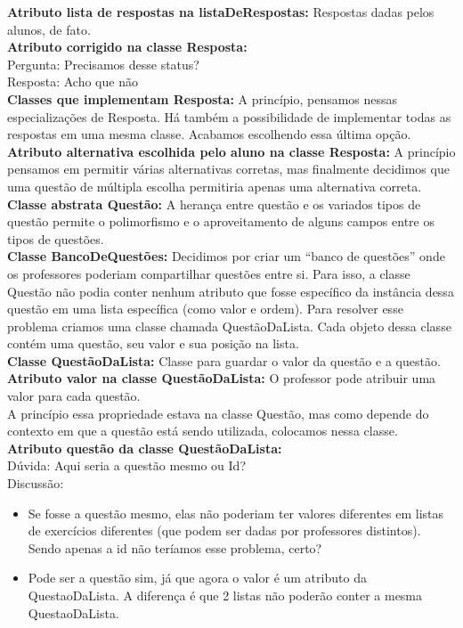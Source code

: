 \documentclass[12pt,letterpaper]{article}
\begin{document}
\textbf{Atributo lista de respostas na listaDeRespostas:}
Respostas dadas pelos alunos, de fato.\\


\textbf{Atributo corrigido na classe Resposta: }\\
Pergunta: Precisamos desse status?\\
Resposta: Acho que não\\


\textbf{Classes que implementam Resposta:}
A princípio, pensamos nessas especializações de Resposta. Há também a possibilidade de implementar todas as respostas em uma mesma classe. Acabamos escolhendo essa última opção.\\


\textbf{Atributo alternativa escolhida pelo aluno na classe Resposta:}
A princípio pensamos em permitir várias alternativas corretas, mas finalmente decidimos que uma questão de múltipla escolha permitiria apenas uma alternativa correta.\\


\textbf{Classe abstrata Questão:}
A herança entre questão e os variados tipos de questão permite o polimorfismo e o aproveitamento de alguns campos entre os tipos de questões.\\


\textbf{Classe BancoDeQuestões:}
Decidimos por criar um “banco de questões” onde os professores poderiam compartilhar questões entre si. Para isso, a classe Questão não podia conter nenhum atributo que fosse específico da instância dessa questão em uma lista específica (como valor e ordem). Para resolver esse problema criamos uma classe chamada QuestãoDaLista. Cada objeto dessa classe contém uma questão, seu valor e sua posição na lista.\\


\textbf{Classe QuestãoDaLista:}
Classe para guardar o valor da questão e a questão.\\

\textbf{Atributo valor na classe QuestãoDaLista:}
O professor pode atribuir uma valor para cada questão.\\
A princípio essa propriedade estava na classe Questão, mas como depende do contexto em que a questão está sendo utilizada, colocamos nessa classe.\\


\textbf{Atributo questão da classe QuestãoDaLista:}\\
Dúvida: Aqui seria a questão mesmo ou Id?\\
Discussão:
\begin{itemize}
\item{}Se fosse a questão mesmo, elas não poderiam ter valores diferentes em listas de exercícios diferentes (que podem ser dadas por professores distintos). Sendo apenas a id não teríamos esse problema, certo?
\item{}Pode ser a questão sim, já que agora o valor é um atributo da QuestaoDaLista. A diferença é que 2 listas não poderão conter a mesma QuestaoDaLista.
\end{itemize}
\end{document}
